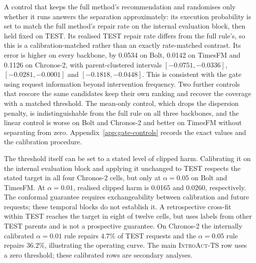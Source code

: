 \documentclass{article}
\newcommand{\introact}{\textsc{IntroAct-TS}}
\begin{document}
A control that keeps the full method's recommendation and randomises only whether it runs
answers the separation approximately: its execution probability is set to match the full
method's repair rate on the internal evaluation block, then held fixed on TEST. Its realised
TEST repair rate differs from the full rule's, so this is a calibration-matched rather than
an exactly rate-matched contrast. Its error is higher on every backbone, by 0.0534 on Bolt,
0.0142 on TimesFM and 0.1126 on Chronos-2, with parent-clustered intervals
$[-0.0751,-0.0336]$, $[-0.0281,-0.0001]$ and $[-0.1818,-0.0448]$. This is consistent with
the gate using request information beyond intervention frequency. Two further controls that rescore the
same candidates keep their own ranking and recover the coverage with a matched threshold. The
mean-only control, which drops the dispersion penalty, is indistinguishable from the full rule
on all three backbones, and the linear control is worse on Bolt and Chronos-2 and better on
TimesFM without separating from zero. Appendix~\ref{app:gate-controls} records the exact
values and the calibration procedure.

The threshold itself can be set to a stated level of clipped harm. Calibrating it on the
internal evaluation block and applying it unchanged to TEST respects the stated target in
all four Chronos-2 cells, but only at $\alpha=0.05$ on Bolt and TimesFM. At $\alpha=0.01$,
realised clipped harm is 0.0165 and 0.0260, respectively. The conformal guarantee requires
exchangeability between calibration and future requests; these temporal blocks do not
establish it. A retrospective cross-fit within TEST reaches the target in eight of twelve
cells, but uses labels from other TEST parents and is not a prospective guarantee. On
Chronos-2 the internally calibrated $\alpha=0.01$ rule repairs $4.7\%$ of TEST requests and
the $\alpha=0.05$ rule repairs $36.2\%$, illustrating the operating curve. The main
\introact{} row uses a zero threshold; these calibrated rows are secondary analyses.
\end{document}
